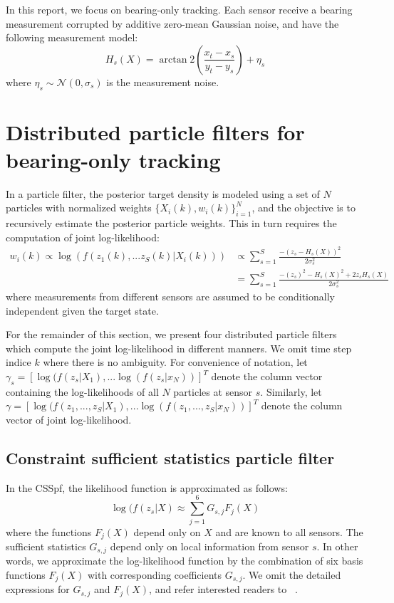 \documentclass[10pt,letterpaper,final]{article}
\begin{document}
In this report, we focus on bearing-only tracking. Each sensor receive a bearing measurement corrupted by additive zero-mean Gaussian noise, and have the following measurement model:
\begin{equation}
H_s(X)= \arctan2 \left( \frac{x_t-x_s}{y_t-y_s} \right) + \eta_s
\label{eqn:bearing}
\end{equation}
where $\eta_s \sim \mathcal{N}(0, \sigma_s)$ is the measurement noise. 

\section{Distributed particle filters for bearing-only tracking}
\label{sec:pf}
In a particle filter, the posterior target density is modeled using a set of $N$ particles with normalized weights $\{X_i(k), w_i(k)\}_{i=1}^N$, and the objective is to recursively estimate the posterior particle weights. This in turn requires the computation of joint log-likelihood:
\begin{align}
w_i(k) \propto \log(f(z_1(k),...z_S(k)|X_i(k))) &\propto \sum_{s=1}^S \frac{-(z_s-H_s(X))^2}{2\sigma_s^2} \nonumber \\ 
&= \sum_{s=1}^S \frac{-(z_s)^2-H_s(X)^2+2z_sH_s(X)}{2\sigma_s^2} \label{eqn:log_lh_normal}
\end{align}
where measurements from different sensors are assumed to be conditionally independent given the target state. 

For the remainder of this section, we present four distributed particle filters which compute the joint log-likelihood in different manners. We omit time step indice $k$ where there is no ambiguity. For convenience of notation, let $\gamma_s = [\log (f(z_s|X_1), ... \log (f(z_s|x_N))]^T$ denote the column vector containing the log-likelihoods of all $N$ particles at sensor $s$. Similarly, let $\gamma = [\log (f(z_1, ..., z_S|X_1), ... \log (f(z_1, ..., z_S|x_N))]^T$ denote the column vector of joint log-likelihood. 

\subsection{Constraint sufficient statistics particle filter}
In the CSSpf, the likelihood function is approximated as follows:
\begin{equation}
\log(f(z_s|X) \approx \sum_{j=1}^6 G_{s,j}F_j(X)
\end{equation}
where the functions $F_j(X)$ depend only on $X$ and are known to all sensors. The sufficient statistics $G_{s,j}$ depend only on local information from sensor $s$. In other words, we approximate the log-likelihood function by the combination of six basis functions $F_j(X)$ with corresponding coefficients $G_{s,j}$. We omit the detailed expressions for $G_{s,j}$ and $F_j(X)$, and refer interested readers to ~\cite{}. 
\end{document}
